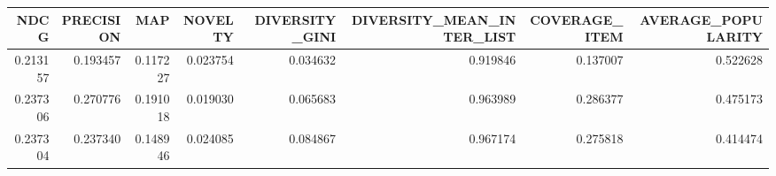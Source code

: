 \begin{tabular}{rrrrrrrr}
\toprule
    NDCG &  PRECISION &      MAP &  NOVELTY &  DIVERSITY\_GINI &  DIVERSITY\_MEAN\_INTER\_LIST &  COVERAGE\_ITEM &  AVERAGE\_POPULARITY \\
\midrule
0.213157 &   0.193457 & 0.117227 & 0.023754 &        0.034632 &                   0.919846 &       0.137007 &            0.522628 \\
0.237306 &   0.270776 & 0.191018 & 0.019030 &        0.065683 &                   0.963989 &       0.286377 &            0.475173 \\
0.237304 &   0.237340 & 0.148946 & 0.024085 &        0.084867 &                   0.967174 &       0.275818 &            0.414474 \\
\bottomrule
\end{tabular}
